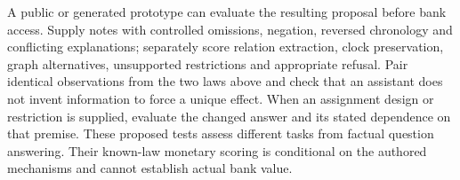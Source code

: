A public or generated prototype can evaluate the resulting proposal before
bank access. Supply notes with controlled omissions, negation, reversed
chronology and conflicting explanations; separately score relation extraction,
clock preservation, graph alternatives, unsupported restrictions and appropriate
refusal. Pair identical observations from the two laws above and check that an
assistant does not invent information to force a unique effect. When an
assignment design or restriction is supplied, evaluate the changed answer and
its stated dependence on that premise. These proposed tests assess different
tasks from factual question answering. Their known-law monetary scoring is
conditional on the authored mechanisms and cannot establish actual bank value.
